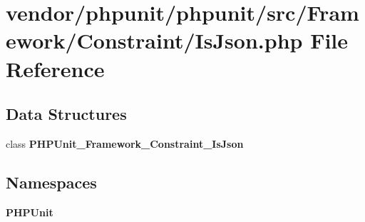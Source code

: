 \section{vendor/phpunit/phpunit/src/\+Framework/\+Constraint/\+Is\+Json.php File Reference}
\label{_is_json_8php}
\subsection*{Data Structures}
\begin{DoxyCompactItemize}
\item 
class {\bf P\+H\+P\+Unit\+\_\+\+Framework\+\_\+\+Constraint\+\_\+\+Is\+Json}
\end{DoxyCompactItemize}
\subsection*{Namespaces}
\begin{DoxyCompactItemize}
\item 
 {\bf P\+H\+P\+Unit}
\end{DoxyCompactItemize}
